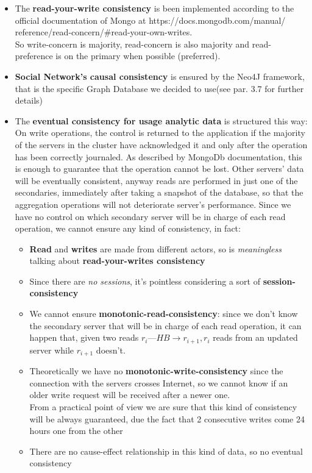 \begin{itemize}
	\item The \textbf{read-your-write consistency} is been implemented according to the official documentation of Mongo at https://docs.mongodb.com/manual/ reference/read-concern/\#read-your-own-writes. \\
	So write-concern is majority, read-concern is also majority and read-preference is on the primary when possible (preferred). 
 	\item \textbf{Social Network’s causal consistency} is ensured by the Neo4J framework, that is the specific Graph Database we decided to use(see par. 3.7 for further details)
	\item The \textbf{eventual consistency for usage analytic data} is structured this way: On write operations, the control is returned to the application if the majority of the servers in the cluster have acknowledged it and only after the operation has been correctly journaled. As described by MongoDb documentation, this is enough to guarantee that the operation cannot be lost. Other servers’ data will be eventually consistent, anyway reads are performed in just one of the secondaries, immediately after taking a snapshot of the database, so that the aggregation operations will not deteriorate server’s performance. Since we have no control on which secondary server will be in charge of each read operation, we cannot ensure any kind of consistency, in fact:

	\begin{itemize}
		\item \textbf{Read} and \textbf{writes} are made from different actors, so is \textit{meaningless} talking about \textbf{read-your-writes consistency}
		\item Since there are \textit{no sessions}, it’s pointless considering a sort of \textbf{session-consistency}
		\item We cannot ensure \textbf{monotonic-read-consistency}: since we don’t know the secondary server that will be in charge of each read operation, it can happen that, given two reads $r_{i}—HB \rightarrow r_{i+1}, r_{i}$ reads from an updated server while $r_{i+1}$ doesn’t.
		\item Theoretically we have no \textbf{monotonic-write-consistency} since the connection with the servers crosses Internet, so we cannot know if an older write request will be received after a newer one. \\
		From a practical point of view we are sure that this kind of consistency will be always guaranteed, due the fact that 2 consecutive writes come 24 hours one from the other
		\item There are no cause-effect relationship in this kind of data, so no eventual consistency		
	\end{itemize}
\end{itemize}

